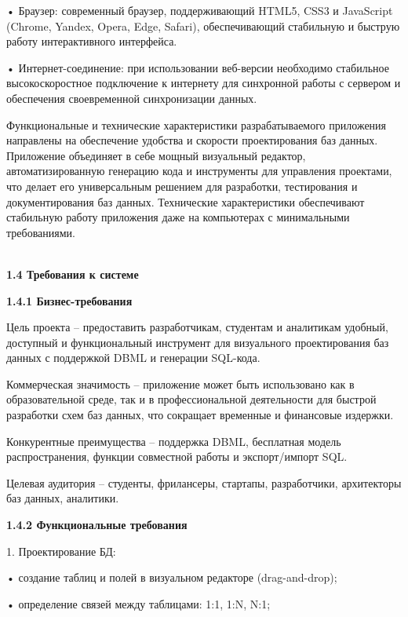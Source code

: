  • Браузер: современный браузер, поддерживающий HTML5, CSS3 и JavaScript (Chrome, Yandex, Opera, Edge, Safari), обеспечивающий стабильную и быструю работу интерактивного интерфейса.
 
 • Интернет-соединение: при использовании веб-версии необходимо стабильное высокоскоростное подключение к интернету для синхронной работы с сервером и обеспечения своевременной синхронизации данных.

Функциональные и технические характеристики разрабатываемого приложения направлены на обеспечение удобства и скорости проектирования баз данных. Приложение объединяет в себе мощный визуальный редактор, автоматизированную генерацию кода и инструменты для управления проектами, что делает его универсальным решением для разработки, тестирования и документирования баз данных. Технические характеристики обеспечивают стабильную работу приложения даже на компьютерах с минимальными требованиями.

\\

\textbf{\large 1.4 Требования к системе}

\textbf{\large 1.4.1 Бизнес-требования}

	Цель проекта – предоставить разработчикам, студентам и аналитикам удобный, доступный и функциональный инструмент для визуального проектирования баз данных с поддержкой DBML и генерации SQL-кода.
    
	Коммерческая значимость – приложение может быть использовано как в образовательной среде, так и в профессиональной деятельности для быстрой разработки схем баз данных, что сокращает временные и финансовые издержки.
    
	Конкурентные преимущества – поддержка DBML, бесплатная модель распространения, функции совместной работы и экспорт/импорт SQL.
    
	Целевая аудитория – студенты, фрилансеры, стартапы, разработчики, архитекторы баз данных, аналитики.

\textbf{\large 1.4.2 Функциональные требования }

	1.	Проектирование БД:
    
	•	создание таблиц и полей в визуальном редакторе (drag-and-drop);
    
	•	определение связей между таблицами: 1:1, 1:N, N:1;
    

